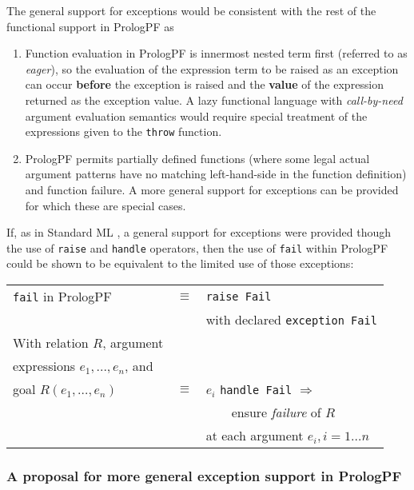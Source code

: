 The general support for exceptions would be consistent with the rest of the
functional support in PrologPF as
\begin{enumerate}
\item{Function evaluation in PrologPF is innermost nested term first (referred to
  as \textit{eager}), so 
  the evaluation of the expression term to be raised as an
  exception can occur \textbf{before} the exception is raised
  and the \textbf{value} of the expression returned as the
  exception value.  A lazy functional language with 
  \textit{call-by-need} argument evaluation semantics would require
  special treatment of the expressions given to the \texttt{throw}
  function.}
\item{PrologPF permits partially defined functions (where some
  legal actual argument patterns have no matching left-hand-side in
  the function definition) and function failure.
  A more general support for exceptions can be provided for
  which these are special cases.
  }
\end{enumerate}

If, as in Standard ML \cite{MTH90}, a general support for
exceptions were provided though the use of \texttt{raise} and
\texttt{handle} operators, then the use of \texttt{fail} within
PrologPF could be shown to be equivalent to the limited use of 
those exceptions:\\
\begin{tabular}{l l l}
\texttt{fail} in PrologPF      &$\equiv$ &\texttt{raise Fail}\\
                               &         &with declared \texttt{exception Fail}\\[4mm]
With relation $R$, argument    &         &\\
expressions $e_1,...,e_n$, and &         & \\
goal $R(e_1,\ldots,e_n)$       &$\equiv$ &$e_i$ \texttt{handle Fail} $\Rightarrow$\\
                               &         &~~~~ensure \textit{failure} of $R$\\
                               &         &at each argument $e_i, i=1\ldots n$\\
\end{tabular}

\subsubsection{A proposal for more general exception support in PrologPF}

